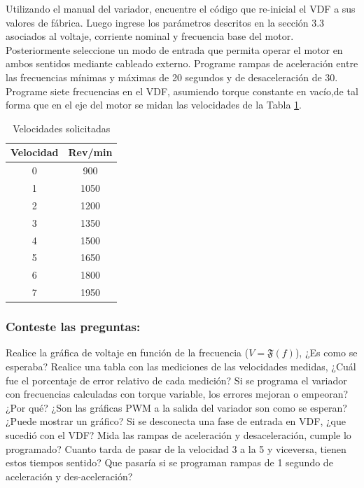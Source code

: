 Utilizando el manual del variador, encuentre el código que re-inicial el VDF a sus valores de fábrica.
Luego ingrese los parámetros descritos en la sección 3.3 asociados al voltaje, corriente nominal y frecuencia base del motor.
Posteriormente seleccione un modo de entrada que permita operar el motor en ambos sentidos mediante cableado externo.
Programe rampas de aceleración entre las frecuencias mínimas y máximas de 20 segundos y de desaceleración de 30.
Programe siete frecuencias en el VDF, asumiendo torque constante en vacío,de tal forma que en el eje del motor se midan las velocidades de la Tabla \ref{Tab:velocidades}.

\begin{table}[H]
	\centering  
	\caption{Velocidades solicitadas}
	\label{Tab:velocidades}
	\begin{tabular}{|c|c|}
		\hline 
		Velocidad	&	Rev/min	\\	\hline 
		
		0	&	900	  	   	 \\ 
		1	&	1050	  	   	 \\ 
		2	&	1200	  	   	 \\ 
		3	&	1350	  	   	 \\ 
		4	&	1500	  	   	 \\ 
		5	&	1650	    	 \\ 
		6	&	1800        	 \\ 
		7	&	1950     	   	 \\ 
		\hline 
	\end{tabular} 
\end{table}
 

 
\subsubsection{Conteste las preguntas:}

Realice la gráfica de voltaje en función de la frecuencia ($V=\mathfrak{F}(f)$), ¿Es como se esperaba?
Realice una tabla con las mediciones de las velocidades medidas, ¿Cuál fue el porcentaje de error relativo de cada medición?
Si se programa el variador con frecuencias calculadas con torque variable, los errores mejoran o empeoran? ¿Por qué?
¿Son las gráficas PWM a la salida del variador son como se esperan? ¿Puede mostrar un gráfico? Si se desconecta una fase de entrada en VDF, ¿que sucedió con el VDF? Mida las rampas de aceleración y desaceleración, cumple lo programado? Cuanto tarda de pasar de la velocidad 3 a la 5 y viceversa, tienen estos tiempos sentido? Que pasaría si se programan rampas de 1 segundo de aceleración y des-aceleración?
 

